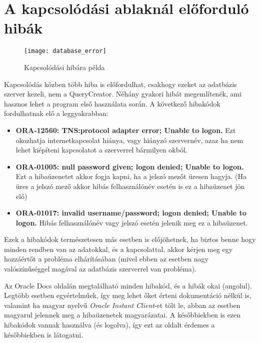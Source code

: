\section{A kapcsolódási ablaknál előforduló hibák}

\begin{figure}[ht]
  \begin{center}
  \texttt{[image: database\_error]}
  \end{center}
 \caption{Kapcsolódási hibára példa}
\end{figure}

Kapcsolódás közben több hiba is előfordulhat, csakhogy ezeket az adatbázis szerver kezeli, nem a QueryCreator.
Néhány gyakori hibát megemlítenék, ami hasznos lehet
a program első használata során. A következő hibakódok fordulhatnak elő a leggyakrabban:
\begin{itemize}
  \item \textbf{ORA-12560: TNS:protocol adapter error; Unable to logon.} Ezt okozhatja internetkapcsolat hiánya,
  vagy hiányzó szervernév, azaz ha nem lehet kiépíteni kapcsolatot a szerverrel bármilyen okból.
  \item \textbf{ORA-01005: null password given; logon denied; Unable to logon.} Ezt a hibaüzenetet akkor fogja kapni,
  ha a jelszó mezőt üresen hagyja. (Ha üres a jelszó mező akkor hibás felhasználónév esetén is ez a hibaüzenet jön elő)
  \item \textbf{ORA-01017: invalid username/password; logon denied; Unable to logon.} Hibás felhasználónév vagy jelszó 
  esetén jelenik meg ez a hibaüzenet.
\end{itemize}

Ezek a hibakódok természetesen más esetben is előjöhetnek, ha biztos benne hogy minden rendben van az adatokkal, és a
kapcsolattal, akkor kérjen meg egy hozzáértőt a probléma elhárításában (mivel ebben az esetben nagy valószínűséggel
magával az adatbázis szerverrel van probléma).

Az Oracle Docs\cite{oracledocs} oldalán megtalálható minden hibakód, és a hibák okai (angolul).
Legtöbb esetben egyértelműek, így meg lehet őket érteni dokumentáció nélkül is, valamint ha magyar nyelvű
\textit{Oracle Instant Client}-et tölt le, abban az esetben magyarul jelennek meg a hibaüzenetek magyarázatai.
A későbbiekben is ezen hibakódok vannak használva (és logolva), így ezt az oldalt érdemes a későbbiekben is látogatni.

